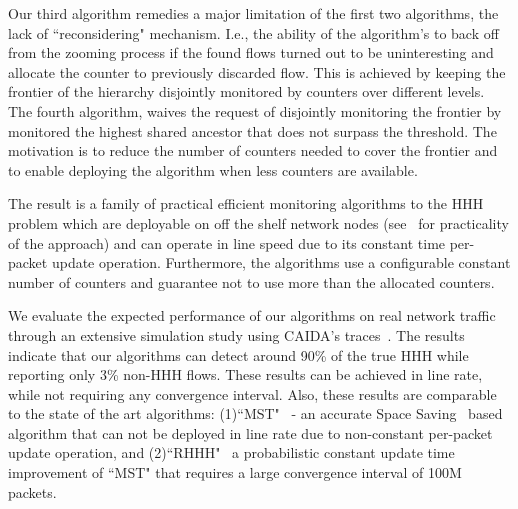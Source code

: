 Our third algorithm remedies a major limitation of the first two algorithms, the lack of ``reconsidering" mechanism. I.e., the ability of the algorithm's to back off from the zooming process if the found flows turned out to be uninteresting and allocate the counter to previously discarded flow. This is achieved by keeping the frontier of the hierarchy disjointly monitored by counters over different levels.
The fourth algorithm, waives the request of disjointly monitoring the frontier by monitored the highest shared ancestor that does not surpass the threshold. The motivation is to reduce the number of counters needed to cover the frontier and to enable deploying the algorithm when less counters are available.


The result is a family of practical efficient monitoring algorithms to the HHH problem which are deployable on off the shelf network nodes (see~\cite{Moraney2016} for practicality of the approach) and can operate in line speed due to its constant time per-packet update operation. Furthermore, the algorithms use a configurable constant number of counters and guarantee not to use more than the allocated counters.

We evaluate the expected performance of our algorithms on real network traffic through an extensive simulation study using CAIDA’s traces~\cite{CAIDA2016, CAIDA2018}.
The results indicate that our algorithms can detect around 90\% of the true HHH while reporting only 3\% non-HHH flows. These results can be achieved in line rate, while not requiring any convergence interval. Also, these results are comparable to the state of the art algorithms: (1)``MST"~\cite{SpaceSaving} - an accurate Space Saving~\cite{Metwally2005} based algorithm that can not be deployed in line rate due to non-constant per-packet update operation, and (2)``RHHH"~\cite{ben2017constant} a probabilistic constant update time improvement of ``MST" that requires a large convergence interval of 100M packets.
